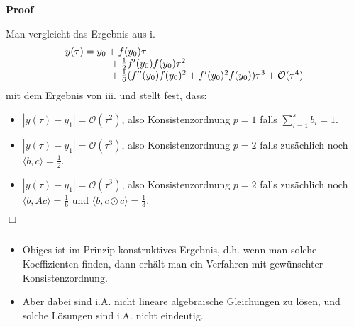 \documentclass{book}
\newcommand{\tmdummy}{$\mbox{}$}
\newenvironment{enumerateroman}{\begin{enumerate}[i.] }{\end{enumerate}}
\newenvironment{itemizedot}{\begin{itemize} \renewcommand{\labelitemi}{$\bullet$}\renewcommand{\labelitemii}{$\bullet$}\renewcommand{\labelitemiii}{$\bullet$}\renewcommand{\labelitemiv}{$\bullet$}}{\end{itemize}}
\newenvironment{proof}{\noindent\textbf{Proof\ }}{\hspace*{\fill}$\Box$\medskip}
\begin{document}
\begin{proof}
\begin{enumerateroman}
    Man vergleicht das Ergebnis aus i.
    \[ \begin{array}{l}
         y (\tau) = y_0 + f (y_0) \tau\\
         \text{{\hspace{4.4em}}} + \frac{1}{2} f' (y_0) f (y_0) \tau^2\\
         \text{{\hspace{4.4em}}} + \frac{1}{6} (f'' (y_0) f (y_0)^2 + f'
         (y_0)^2 f (y_0)) \tau^3 +\mathcal{O} (\tau^4)
       \end{array} \]
    mit dem Ergebnis von iii. und stellt fest, dass:
    \begin{itemizedot}
      \item $| y (\tau) - y_1 | =\mathcal{O} (\tau^2)$, also Konsistenzordnung
      $p = 1$ falls $\sum_{i = 1}^s b_i = 1$.
      
      \item $| y (\tau) - y_1 | =\mathcal{O} (\tau^3)$, also Konsistenzordnung
      $p = 2$ falls zus{\"a}chlich noch $\langle b, c \rangle = \frac{1}{2}$.
      
      \item $| y (\tau) - y_1 | =\mathcal{O} (\tau^3)$, also Konsistenzordnung
      $p = 2$ falls zus{\"a}chlich noch $\langle b, A  c \rangle =
      \frac{1}{6}$ und $\langle b, c \odot c \rangle = \frac{1}{3}$.
    \end{itemizedot}
  \end{enumerateroman}
\end{proof}

\begin{remark*}
  {\tmdummy}
  
  \begin{itemizedot}
    \item Obiges ist im Prinzip konstruktives Ergebnis, d.h. wenn man solche
    Koeffizienten finden, dann erh{\"a}lt man ein Verfahren mit
    gew{\"u}nschter Konsistenzordnung.
    
    \item Aber dabei sind i.A. nicht lineare algebraische Gleichungen zu
    l{\"o}sen, und solche L{\"o}sungen sind i.A. nicht eindeutig. 
  \end{itemizedot}
\end{remark*}
\end{document}
